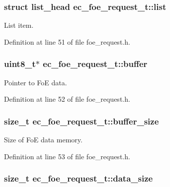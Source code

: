 \subsubsection[{list}]{\setlength{\rightskip}{0pt plus 5cm}struct list\-\_\-head {\bf ec\-\_\-foe\-\_\-request\-\_\-t\-::list}}\label{structec__foe__request__t_a3934835725b006bc6268d2553234901a}


\-List item. 



\-Definition at line 51 of file foe\-\_\-request.\-h.

\subsubsection[{buffer}]{\setlength{\rightskip}{0pt plus 5cm}uint8\-\_\-t$\ast$ {\bf ec\-\_\-foe\-\_\-request\-\_\-t\-::buffer}}\label{structec__foe__request__t_a9f6af09dc6347bb9139f488c7ca48427}


\-Pointer to \-Fo\-E data. 



\-Definition at line 52 of file foe\-\_\-request.\-h.

\subsubsection[{buffer\-\_\-size}]{\setlength{\rightskip}{0pt plus 5cm}size\-\_\-t {\bf ec\-\_\-foe\-\_\-request\-\_\-t\-::buffer\-\_\-size}}\label{structec__foe__request__t_a5cf1b56bd0f3406f9cf36650fc5ac7aa}


\-Size of \-Fo\-E data memory. 



\-Definition at line 53 of file foe\-\_\-request.\-h.

\subsubsection[{data\-\_\-size}]{\setlength{\rightskip}{0pt plus 5cm}size\-\_\-t {\bf ec\-\_\-foe\-\_\-request\-\_\-t\-::data\-\_\-size}}\label{structec__foe__request__t_aa7b6efa4a99fe568f8f53ae0b2ebc2e4}


